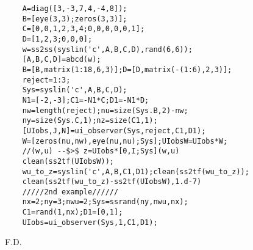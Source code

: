 \begin{examples}
  \begin{Verbatim}
    A=diag([3,-3,7,4,-4,8]);
    B=[eye(3,3);zeros(3,3)];
    C=[0,0,1,2,3,4;0,0,0,0,0,1];
    D=[1,2,3;0,0,0];
    w=ss2ss(syslin('c',A,B,C,D),rand(6,6));
    [A,B,C,D]=abcd(w);
    B=[B,matrix(1:18,6,3)];D=[D,matrix(-(1:6),2,3)];
    reject=1:3;
    Sys=syslin('c',A,B,C,D);
    N1=[-2,-3];C1=-N1*C;D1=-N1*D;
    nw=length(reject);nu=size(Sys.B,2)-nw;
    ny=size(Sys.C,1);nz=size(C1,1);
    [UIobs,J,N]=ui_observer(Sys,reject,C1,D1);
    W=[zeros(nu,nw),eye(nu,nu);Sys];UIobsW=UIobs*W;   
    //(w,u) --$>$ z=UIobs*[0,I;Sys](w,u)
    clean(ss2tf(UIobsW));
    wu_to_z=syslin('c',A,B,C1,D1);clean(ss2tf(wu_to_z));
    clean(ss2tf(wu_to_z)-ss2tf(UIobsW),1.d-7)
    /////2nd example//////
    nx=2;ny=3;nwu=2;Sys=ssrand(ny,nwu,nx);
    C1=rand(1,nx);D1=[0,1];
    UIobs=ui_observer(Sys,1,C1,D1);
  \end{Verbatim}
\end{examples}
\begin{manseealso}
      
\end{manseealso}
\begin{authors}
  F.D.  
\end{authors}

